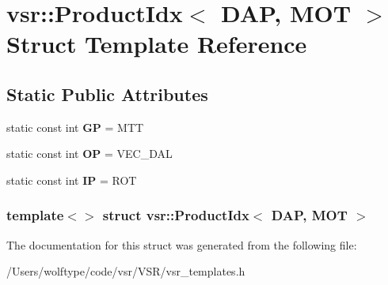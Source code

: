 \hypertarget{structvsr_1_1_product_idx_3_01_d_a_p_00_01_m_o_t_01_4}{\section{vsr\-:\-:Product\-Idx$<$ D\-A\-P, M\-O\-T $>$ Struct Template Reference}
\label{structvsr_1_1_product_idx_3_01_d_a_p_00_01_m_o_t_01_4}
}
\subsection*{Static Public Attributes}
\begin{DoxyCompactItemize}
\item 
\hypertarget{structvsr_1_1_product_idx_3_01_d_a_p_00_01_m_o_t_01_4_a2e26fc86186678e466b10520fd6708b5}{static const int {\bfseries G\-P} = M\-T\-T}\label{structvsr_1_1_product_idx_3_01_d_a_p_00_01_m_o_t_01_4_a2e26fc86186678e466b10520fd6708b5}

\item 
\hypertarget{structvsr_1_1_product_idx_3_01_d_a_p_00_01_m_o_t_01_4_a6ee1d99cf66362ad576cb1d64fbafd19}{static const int {\bfseries O\-P} = V\-E\-C\-\_\-\-D\-A\-L}\label{structvsr_1_1_product_idx_3_01_d_a_p_00_01_m_o_t_01_4_a6ee1d99cf66362ad576cb1d64fbafd19}

\item 
\hypertarget{structvsr_1_1_product_idx_3_01_d_a_p_00_01_m_o_t_01_4_ad840873ecc8b06e1db6b27a23998397c}{static const int {\bfseries I\-P} = R\-O\-T}\label{structvsr_1_1_product_idx_3_01_d_a_p_00_01_m_o_t_01_4_ad840873ecc8b06e1db6b27a23998397c}

\end{DoxyCompactItemize}
\subsubsection*{template$<$$>$ struct vsr\-::\-Product\-Idx$<$ D\-A\-P, M\-O\-T $>$}



The documentation for this struct was generated from the following file\-:\begin{DoxyCompactItemize}
\item 
/\-Users/wolftype/code/vsr/\-V\-S\-R/vsr\-\_\-templates.\-h\end{DoxyCompactItemize}

